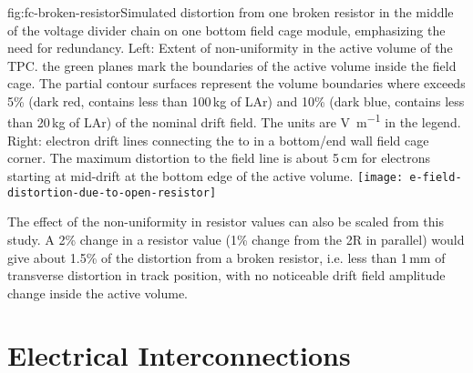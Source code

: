\begin{dunefigure}{fig:fc-broken-resistor}{Simulated \efield{} distortion from one broken resistor in the middle of the voltage divider chain on one bottom field cage module, emphasizing the need for redundancy. Left: Extent of \efield{} non-uniformity in the active volume of the TPC. the green planes mark the boundaries of the active volume inside the field cage. The partial contour surfaces represent the volume boundaries where \efield{} exceeds 5\% (dark red, contains less than 100\,kg of LAr) and 10\% (dark blue, contains less than 20\,kg of LAr) of the nominal drift field. The units are \si{\volt\per\m} in the legend. Right: electron drift lines connecting the  to  in a bottom/end wall field cage corner.  The maximum distortion to the field line is about 5\,cm for electrons starting at mid-drift at the bottom edge of the active volume.}
\texttt{[image: e-field-distortion-due-to-open-resistor]}
\end{dunefigure}
The effect of the non-uniformity in resistor values can also be scaled from this study.  A 2\% change in a resistor value (1\% change from the 2R in parallel) would give about 1.5\% of the distortion from a broken resistor, i.e. less than 1\,mm of transverse distortion in track position, with no noticeable drift field amplitude change inside the active volume.
 


\section{Electrical Interconnections} %
\label{sec:fdsp-hv-design-interconnect}

